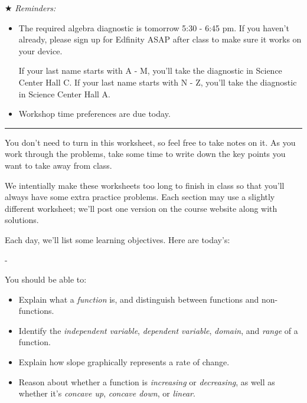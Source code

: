 \documentclass{article}
\makeatletter
\newlength{\tipmargin}
\renewenvironment{framed}{
  \setlength{\tipmargin}{\textwidth-\linewidth}
  \advance\@totalleftmargin-\tipmargin
  \def\FrameCommand{\hspace{\tipmargin}\fbox}%
  \advance\linewidth\tipmargin
  \MakeFramed {\advance\hsize-\width \FrameRestore}%
}
{\endMakeFramed}
\makeatother
\begin{document}
 \begin{problemonly}
    $\bigstar$ \emph{Reminders:}
    \begin{itemize}
    \item The required algebra diagnostic is tomorrow 5:30 - 6:45 pm. If you haven't already, please sign up for Edfinity ASAP after class to make sure it works on your device.

      If your last name starts with A - M, you'll take the diagnostic in Science Center Hall C. If your last name starts with N - Z, you'll take the diagnostic in Science Center Hall A.

    \item Workshop time preferences are due today. 
    \end{itemize}

    \begin{center}
      \rule{5in}{0.4pt}
    \end{center}

    You don't need to turn in this worksheet, so feel free to take notes on it. As you work through the problems, take some time to write down the key points you want to take away from class.

    We intentially make these worksheets too long to finish in class so that you'll always have some extra practice problems. Each section may use a slightly different worksheet; we'll post one version on the course website along with solutions. 

    Each day, we'll list some learning objectives. Here are today's: 
  \end{problemonly}
 

\begin{problemonly}
  \begin{framed}

You should be able to:
    \begin{itemize}[topsep=0pt,partopsep=0pt,parsep=8pt,itemsep=0pt]

    \item Explain what a \emph{function} is, and distinguish between
      functions and non-functions.

    \item Identify the \emph{independent variable}, \emph{dependent
        variable}, \emph{domain}, and \emph{range} of a function.

    \item Explain how slope graphically represents a rate of change.

    \item Reason about whether a function is \emph{increasing} or
      \emph{decreasing}, as well as whether it's \emph{concave up}, 
      \emph{concave down}, or \emph{linear}.

    \end{itemize}
  \end{framed}
\end{problemonly}
\end{document}
